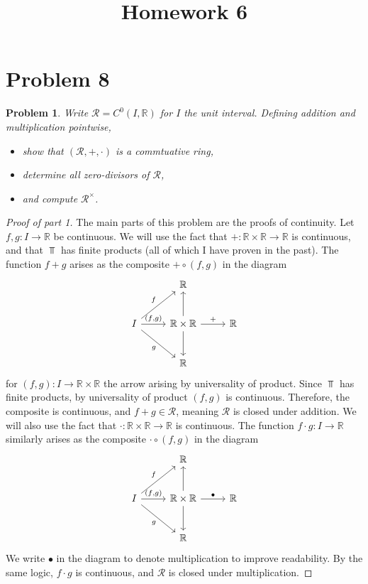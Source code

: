 \documentclass[11pt, letterpaper]{article}
\title{Homework 6}
\theoremstyle{plain}
\newtheorem{problem}{Problem}[section]
\begin{document}
\makeproblem
\setcounter{section}{7}
\section{Problem 8}
\begin{problem}
	Write $\mathcal{R} =C^0(I,\mathbb{R} )$ for $I$ the unit interval. Defining addition and multiplication pointwise,
	\begin{itemize}
		\item show that $(\mathcal{R} ,+,\cdot )$ is a commtuative ring,
		\item determine all zero-divisors of $\mathcal{R} $,
		\item and compute $\mathcal{R} ^\times $.
	\end{itemize}
\end{problem}
\begin{proof}[Proof of part 1]
	The main parts of this problem are the proofs of continuity. Let $f,g : I \to \mathbb{R} $ be continuous. We will use the fact that $+: \mathbb{R} \times \mathbb{R}  \to \mathbb{R} $ is continuous, and that $\Top $ has finite products (all of which I have proven in the past). The function $f+g$ arises as the composite $+\circ  (f,g)$ in the diagram
	\[\begin{tikzcd}[row sep = 2.5em, column sep = 2.5em]
	 &  \mathbb{R}  &  \\
	I \ar[" f ", ur] \ar[" g "', dr] \ar[" (f\text{,} g) ", r]  &  \mathbb{R} \times \mathbb{R} \ar[u] \ar[d] \ar[" + ", r]  & \mathbb{R}  \\
	 &  \mathbb{R}  & 
	\end{tikzcd}\]
	for $(f,g) : I\to \mathbb{R} \times \mathbb{R} $ the arrow arising by universality of product. Since $\Top $ has finite products, by universality of product $(f,g)$ is continuous. Therefore, the composite is continuous, and $f+g\in \mathcal{R} $, meaning $\mathcal{R} $ is closed under addition. We will also use the fact that $\cdot : \mathbb{R} \times \mathbb{R}  \to \mathbb{R} $ is continuous. The function $f\cdot g : I \to \mathbb{R} $ similarly arises as the composite $\cdot  \circ (f,g)$ in the diagram
	\[\begin{tikzcd}[row sep = 2.5em, column sep = 2.5em]
	 &  \mathbb{R}  &  \\
	I \ar[" f ", ur] \ar[" g "', dr] \ar[" (f\text{,} g) ", r]  & \mathbb{R} \times \mathbb{R} \ar[u] \ar[d] \ar[" \bullet ", r]  & \mathbb{R}  \\
	 &  \mathbb{R}  & 
	\end{tikzcd}\]
	We write $\bullet$ in the diagram to denote multiplication to improve readability. By the same logic, $f\cdot g$ is continuous, and $\mathcal{R} $ is closed under multiplication.


\end{proof}
\end{document}
